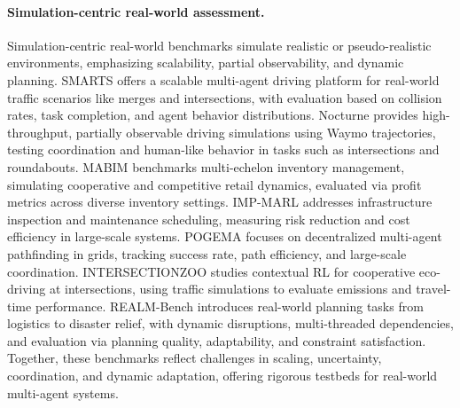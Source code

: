 \paragraph{Simulation-centric real-world assessment.}
Simulation-centric real-world benchmarks simulate realistic or pseudo-realistic environments, emphasizing scalability, partial observability, and dynamic planning. SMARTS \citep{zhou2020smarts} offers a scalable multi-agent driving platform for real-world traffic scenarios like merges and intersections, with evaluation based on collision rates, task completion, and agent behavior distributions. Nocturne \citep{vinitsky2022nocturne} provides high-throughput, partially observable driving simulations using Waymo trajectories, testing coordination and human-like behavior in tasks such as intersections and roundabouts. MABIM \citep{yang2023versatile} benchmarks multi-echelon inventory management, simulating cooperative and competitive retail dynamics, evaluated via profit metrics across diverse inventory settings. IMP-MARL \citep{leroy2023imp} addresses infrastructure inspection and maintenance scheduling, measuring risk reduction and cost efficiency in large-scale systems. POGEMA \citep{skrynnik2024pogema} focuses on decentralized multi-agent pathfinding in grids, tracking success rate, path efficiency, and large-scale coordination. INTERSECTIONZOO \citep{jayawardana2024intersectionzoo} studies contextual RL for cooperative eco-driving at intersections, using traffic simulations to evaluate emissions and travel-time performance. REALM-Bench \citep{geng2025realm} introduces real-world planning tasks from logistics to disaster relief, with dynamic disruptions, multi-threaded dependencies, and evaluation via planning quality, adaptability, and constraint satisfaction. Together, these benchmarks reflect challenges in scaling, uncertainty, coordination, and dynamic adaptation, offering rigorous testbeds for real-world multi-agent systems.

